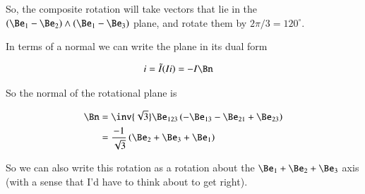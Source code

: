 \documentclass{article}
\begin{document}
So, the composite rotation will take vectors that lie in the $(\Be_1 - \Be_{2}) \wedge (\Be_1 - \Be_{3})$ plane, and rotate them by $2\pi/3 = 120^\circ$.

In terms of a normal we can write the plane in its dual form 

\begin{align*}
i &= \tilde{I}(I i) = -I \Bn
\end{align*}

So the normal of the rotational plane is

\begin{align*}
\Bn 
&= \inv{\sqrt{3}} \Be_{123} \left( -\Be_{13} - \Be_{21} + \Be_{23} \right) \\
&= \frac{-1}{\sqrt{3}} \left( \Be_{2} + \Be_{3} + \Be_{1} \right) \\
\end{align*}

So we can also write this rotation as a rotation about the $\Be_1 + \Be_2 + \Be_3$ axis (with a sense that I'd have to think about to get right).

%
%
\end{document}
